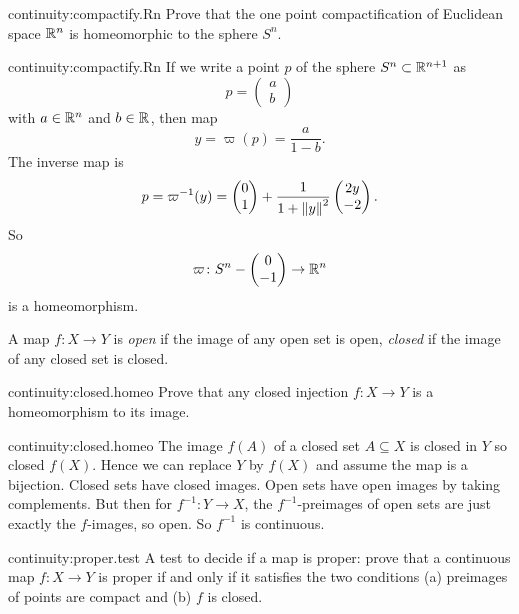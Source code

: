 \begin{problem}{continuity:compactify.Rn}
Prove that the one point compactification of Euclidean space \(\mathbb{R}^{n}\) is homeomorphic to the sphere \(S^n\).
\end{problem}
\begin{answer}{continuity:compactify.Rn}
If we write a point \(p\) of the sphere \(S^n\subset\mathbb{R}^{n+1}\) as
\[
p=
\begin{pmatrix}
a\\
b
\end{pmatrix}
\]
with \(a\in\mathbb{R}^{n}\) and \(b\in\mathbb{R}^{}\), then map
\[
y=\varpi(p)=\frac{a}{1-b}.
\]
The inverse map is
\[
p=\varpi^{-1}(y)=
\begin{pmatrix}
0\\
1
\end{pmatrix}
+
\frac{1}{1+\left\|y\right\|^2}
\begin{pmatrix}
2y\\
-2
\end{pmatrix}.
\]
So 
\[
\varpi\colon S^n-\begin{pmatrix}
0\\
-1
\end{pmatrix}
\to\mathbb{R}^{n}
\]
is a homeomorphism.
\end{answer}
\begin{center}

\end{center}
A map \(f\colon X \to Y\) is \emph{open} if the image of any open set is open, \emph{closed} if the image of any closed set is closed.
\begin{problem}{continuity:closed.homeo}
Prove that any closed injection \(f\colon X\to Y\) is a homeomorphism to its image.
\end{problem}
\begin{answer}{continuity:closed.homeo}
The image \(f(A)\) of a closed set \(A\subseteq X\) is closed in \(Y\) so closed \(f(X)\).
Hence we can replace \(Y\) by \(f(X)\) and assume the map is a bijection.
Closed sets have closed images.
Open sets have open images by taking complements.
But then for \(f^{-1}\colon Y\to X\), the \(f^{-1}\)-preimages of open sets are just exactly the \(f\)-images, so open.
So \(f^{-1}\) is continuous.
\end{answer}
\begin{problem*}{continuity:proper.test}
A test to decide if a map is proper: prove that a continuous map \(f \colon X \to Y\) is proper if and only if it satisfies the two conditions (a) preimages of points are compact and (b) \(f\) is closed.
\end{problem*}
